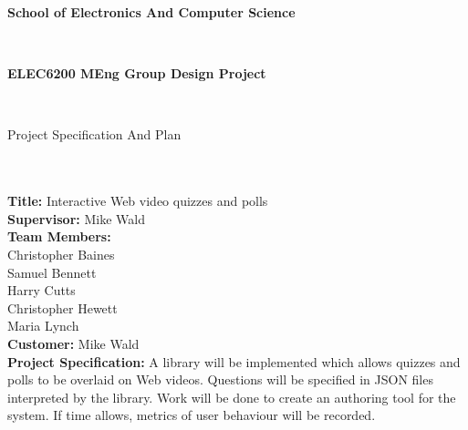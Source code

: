 \documentclass[12pt,a4paper]{article}
\begin{document}

\begin{Large}
\textbf{School of Electronics And Computer Science
}\end{Large}\\

\begin{Large}
\textbf{ELEC6200    MEng Group Design Project
}\end{Large}\\

\begin{Large}
Project Specification And Plan
\end{Large}\\\\

\textbf{Title:}
Interactive Web video quizzes and polls\\

\textbf{Supervisor:}	
Mike Wald\\

\textbf{Team Members:}\\
Christopher Baines\\
Samuel Bennett\\
Harry Cutts\\
Christopher Hewett\\
Maria Lynch\\

\textbf{Customer:}
Mike Wald\\

\textbf{Project Specification:}
A library will be implemented which allows quizzes and polls to be overlaid on Web videos. Questions will be specified in JSON files interpreted by the library. Work will be done to create an authoring tool for the system. If time allows, metrics of user behaviour will be recorded.\\
\end{document}
